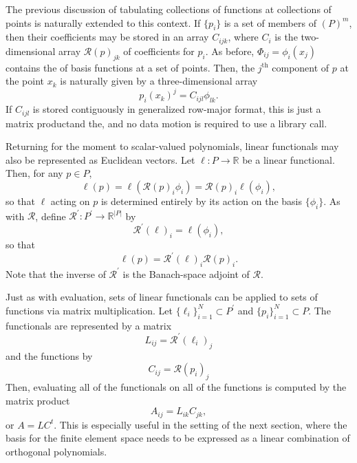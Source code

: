 The previous discussion of tabulating collections of functions at
collections of points is naturally extended to this context.  If \( \{
p_i \} \) is a set of members of \( (P)^m \), then their coefficients
may be stored in an array \( C_{ijk} \), where \( C_i \) is the
two-dimensional array \( \mathcal{R}(p)_{jk} \) of coefficients for \(
p_i \).  As before, \( \Phi_{ij} = \phi_i(x_j) \) contains the of
basis functions at a set of points.  Then, the \( j^\mathrm{th} \)
component of \( p \) at the point \( x_k \) is naturally given by a
three-dimensional array
\[
p_i(x_k)^j = C_{ijl} \phi_{lk}.
\]
If \( C_{ijl} \)
is stored contiguously in generalized row-major format, this is just a
matrix productand the, and no data motion is required to use a library call. 

Returning for the moment to scalar-valued polynomials, linear
functionals may also be represented as
Euclidean vectors.  Let \( \ell: P \rightarrow \mathbb{R} \) be a linear
functional.  Then, for any \( p \in P \),
\[
\ell( p ) = \ell( \mathcal{R}(p)_i \phi_i )
= \mathcal{R}(p)_i \ell( \phi_i ),
\]
so that \( \ell \) acting on \( p \) is determined entirely by its
action on the basis \( \{ \phi_i \} \).  As with \( \mathcal{R} \), define
\( \mathcal{R}^\prime : P^\prime \rightarrow \mathbb{R}^{|P|} \) by
\[
  \mathcal{R}^\prime (\ell)_i
= \ell( \phi_i),
\]
so that
\[
\ell(p) = \mathcal{R}^\prime(\ell)_i\mathcal{R}(p)_i.
\]
Note that the inverse of \( \mathcal{R}^\prime \) is the Banach-space
adjoint of \( \mathcal{R} \).

Just as with evaluation, sets of linear functionals can be applied to
sets of functions via matrix multiplication.  Let \( \{ \ell_i
\}_{i=1}^N \subset P^\prime \) and \( \{ p_i \}_{i=1}^N \subset P \).
The functionals are represented by a matrix
\[
L_{ij} = \mathcal{R}^\prime(\ell_i)_j
\]
and the functions by
\[
C_{ij} = \mathcal{R}(p_i)_j
\]
Then, evaluating all of the functionals on all of the functions is
computed by the matrix product
\begin{equation}
A_{ij} = L_{ik}C_{jk},
\end{equation}
or \( A = L C^t \).  This is especially useful in the setting of the
next section, where the basis for the finite element space needs to be
expressed as a linear combination of orthogonal polynomials.

